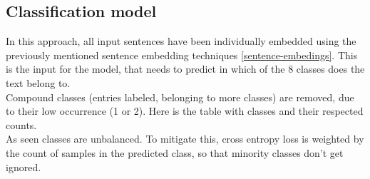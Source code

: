 \documentclass[fleqn,moreauthors,10pt]{ds_report}
\begin{document}
\begin{table}[h]
    \centering
    \caption{Cluster composition percentages using agglomerative clustering with embeddings from transformer all-mpnet-base-v2.}
    \label{tab:clusters_agglomerative}
    \end{table}


\subsection{Classification model}
In this approach, all input sentences have been individually embedded using the previously mentioned sentence embedding techniques \ref{sentence-embedings}. This is the input for the model, that needs to predict in which of the 8 classes does the text belong to. \\

Compound classes (entries labeled, belonging to more classes) are removed, due to their low occurrence (1 or 2). Here is the table with classes and their respected counts. \\




As seen classes are unbalanced. To mitigate this, cross entropy loss is weighted by the count of samples in the predicted class, so that minority classes don't get ignored.
\end{document}
